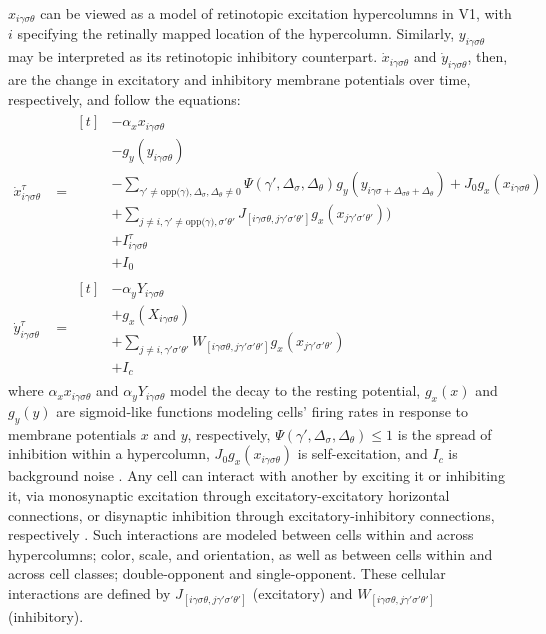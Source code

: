 \documentclass[journal,onecolumn]{IEEEtran}
\begin{document}
$x_{i\gamma\sigma\theta}$ can be viewed as a model of retinotopic excitation hypercolumns in V1, with $i$ specifying the retinally mapped location of the hypercolumn. Similarly, $y_{i\gamma\sigma\theta}$ may be interpreted as its retinotopic inhibitory counterpart. $\dot{x}_{i\gamma\sigma\theta}$ and $\dot{y}_{i\gamma\sigma\theta}$, then, are the change in excitatory and inhibitory membrane potentials over time, respectively, and follow the equations:
\begin{align}
    \dot{x}^\tau_{i\gamma\sigma\theta} &= \begin{aligned}[t]
        & - \alpha_{x}x_{i\gamma\sigma\theta} \label{eq:delta-x} \\
        & - g_y(y_{i\gamma\sigma\theta}) \\
        & - \sum\nolimits_{\gamma' \neq \text{opp($\gamma$)},\Delta_{\sigma},\Delta_{\theta} \neq 0}
            \Psi(\gamma',\Delta_{\sigma},\Delta_{\theta})
            g_y(y_{i\gamma\sigma + \Delta_{\sigma\theta} + \Delta_{\theta}})
            + J_0g_x(x_{i\gamma\sigma\theta}) \\
        & + \sum\nolimits_{j \neq i,\gamma' \neq \text{opp($\gamma$)},\sigma'\theta'}
            J_{[i\gamma\sigma\theta, j\gamma'\sigma'\theta']}g_x(x_{j\gamma'\sigma'\theta'})) \\
        & + I^\tau_{i\gamma\sigma\theta} \\
        & + I_0
        \end{aligned} \\
    \dot{y}^\tau_{i\gamma\sigma\theta} &= \begin{aligned}[t]
        & - \alpha_{y}Y_{i\gamma\sigma\theta} \label{eq:delta-y} \\
        & + g_x(X_{i\gamma\sigma\theta}) \\
        & + \sum\nolimits_{j \neq i, \gamma'\sigma'\theta'}
            W_{[i\gamma\sigma\theta, j\gamma'\sigma'\theta']}g_x(x_{j\gamma'\sigma'\theta'}) \\
        & + I_{c}
       \end{aligned}
\end{align}
where $\alpha_{x}x_{i\gamma\sigma\theta}$ and $\alpha_{y}Y_{i\gamma\sigma\theta}$ model the decay to the resting potential, $g_x(x)$ and $g_y(y)$ are sigmoid-like functions modeling cells' firing rates in response to membrane potentials $x$ and $y$, respectively, $\Psi(\gamma',\Delta_{\sigma},\Delta_{\theta}) \leq 1$ is the spread of inhibition within a hypercolumn, $J_0g_x(x_{i\gamma\sigma\theta})$ is self-excitation, and $I_c$ is background noise \cite{li:1999}.
Any cell can interact with another by exciting it or inhibiting it, via monosynaptic excitation through excitatory-excitatory horizontal connections, or disynaptic inhibition through excitatory-inhibitory connections, respectively \cite{penacchio:2013}. Such interactions are modeled between cells within and across hypercolumns; color, scale, and orientation, as well as between cells within and across cell classes; double-opponent and single-opponent. These cellular interactions are defined by $J_{[i\gamma\sigma\theta, j\gamma'\sigma'\theta']}$ (excitatory) and $W_{[i\gamma\sigma\theta, j\gamma'\sigma'\theta']}$ (inhibitory). 
\end{document}
